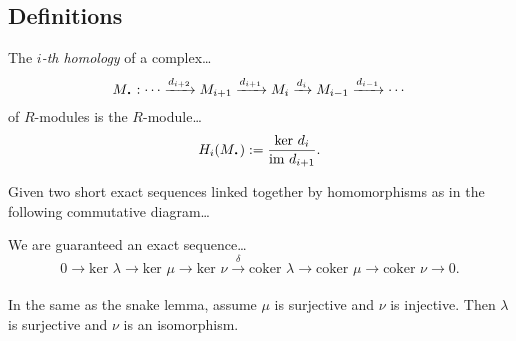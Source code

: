 \subsection{Definitions}\label{homologydefinitions}

The \emph{$i$-th homology} of a complex\dots
$$M_{\LargerCdot}: \cdots \xrightarrow[]{d_{i+2}} M_{i+1} \xrightarrow[]{d_{i+1}}  M_i \xrightarrow[]{d_i} M_{i-1} \xrightarrow[]{d_{i-1}} \cdots$$
of $R$-modules is the $R$-module\dots
$$H_i(M_{\LargerCdot}) := \frac{\textrm{ker }d_i}{\textrm{im }d_{i+1}}.$$

\begin{lemma}
\label{snakelemma}
Given two short exact sequences linked together by homomorphisms as in the following commutative diagram\dots
\begin{figure}[H]
\centering

\end{figure}
\noindent We are guaranteed an exact sequence\dots
$$0 \rightarrow \textrm{ker } \lambda \rightarrow \textrm{ker } \mu \rightarrow \textrm{ker } \nu \xrightarrow[]{\delta} \textrm{coker } \lambda \rightarrow \textrm{coker } \mu \rightarrow \textrm{coker } \nu \rightarrow 0.$$
\end{lemma}

\begin{corollary}
In the same as the snake lemma, assume $\mu$ is surjective and $\nu$ is injective. Then $\lambda$ is surjective and $\nu$ is an isomorphism.
\end{corollary}